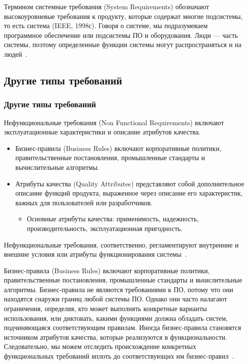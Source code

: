 \documentclass{../industrial-development}
\begin{document}
Термином \alert{системные требования (System Requirements)} обозначают высокоуровневые требования к продукту, которые содержат многие подсистемы, то есть система (IEEE, 1998с). Говоря о системе, мы подразумеваем программное обеспечение или подсистемы ПО и оборудования. Люди — часть системы, поэтому определенные функции системы могут распространяться и на людей~\cite[с.~9]{Wiegers}.

\subsection{Другие типы требований}
\begin{frame} \frametitle{Другие типы требований}
  \begin{block}{}
\alert{Нефункциональные требования (Non Functional Requirements)}	включают эксплуатационные характеристики и описание атрибутов качества.
  \end{block}
	\begin{itemize}
\item \alert{Бизнес-правила (Business Rules)}	включают корпоративные политики, правительственные постановления, промышленные стандарты и вычислительные алгоритмы.
\item \alert{Атрибуты качества (Quality Attributes)} представляют собой дополнительное описание функций продукта, выраженное через описание его характеристик, важных для пользователей или разработчиков.
	\begin{itemize}
	\item Основные атрибуты качества: применимость,  надежность, производительность, эксплуатационная пригодность.
	\end{itemize}
	\end{itemize}
		\end{frame}
		
\lecturenotes

Нефункциональные требования, соответственно, регламентируют внутренние и внешние условия или атрибуты функционирования системы~\cite[с.~10]{Maglinec}.

\alert{Бизнес-правила (Business Rules)} включают корпоративные политики, правительственные постановления, промышленные стандарты и вьчислительные алгоритмы. Бизнес-правила не являются требованиями к ПО, потому что они находятся снаружи границ любой системы ПО. Однако они часто налагают ограничения, определяя, кто может выполнять конкретные варианты использования, или диктовать, какими функциями должна обладать систем, подчиняющаяся соответствующим правилам. Иногда бизнес-правила становятся источником атрибутов качества, которые реализуются в функциональности. Следовательно, мы можем отследить происхождение конкретных функциональных требований вплоть до соответствующих им бизнес-правил~\cite[с.~9]{Wiegers}.
\end{document}
